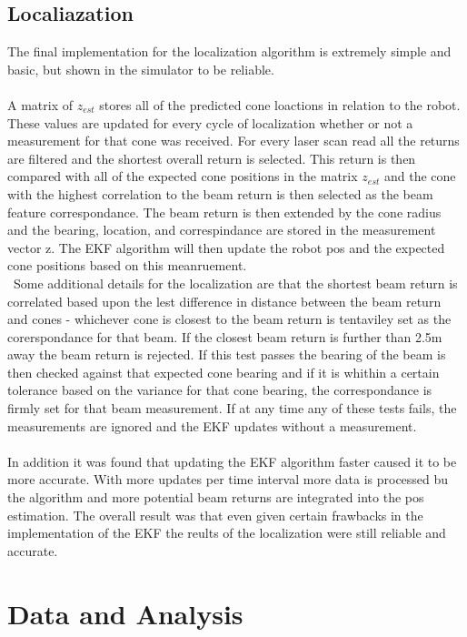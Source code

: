 \documentclass[letterpaper,12pt]{article}
\begin{document}
\subsection*{Localiazation} 
The final implementation for the localization algorithm is extremely simple and basic, but shown in the simulator to be reliable.
\\\\
A matrix of $z_{est}$ stores all of the predicted cone loactions in relation to the robot. These values are updated for every cycle of localization whether or not a measurement for that cone was received. For every laser scan read all the returns are filtered and the shortest overall return is selected. This return is then compared with all of the expected cone positions in the matrix $z_{est}$ and the cone with the highest correlation to the beam return is then selected as the beam feature correspondance. The beam return is then extended by the cone radius and the bearing, location, and correspindance are stored in the measurement vector z. The EKF algorithm will then update the robot pos and the expected cone positions based on this meanruement. 
\\\
Some additional details for the localization are that the shortest beam return is correlated based upon the lest difference in distance between the beam return and cones - whichever cone is closest to the beam return is tentaviley set as the corerspondance for that beam. If the closest beam return is further than 2.5m away the beam return is rejected. If this test passes the bearing of the beam is then checked against that expected cone bearing and if it is whithin a certain tolerance based on the variance for that cone bearing, the correspondance is firmly set for that beam measurement. If at any time any of these tests fails, the measurements are ignored and the EKF updates without a measurement. 
\\\\ 
In addition it was found that updating the EKF algorithm faster caused it to be more accurate. With more updates per time interval more data is processed bu the algorithm and more potential beam returns are integrated into the pos estimation. The overall result was that even given certain frawbacks in the implementation of the EKF the reults of the localization were still reliable and accurate. 

\section{Data and Analysis}
\end{document}
